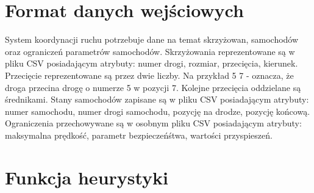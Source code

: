 \section{Format danych wejściowych}

System koordynacji ruchu potrzebuje dane na temat skrzyżowan, samochodów oraz ograniczeń parametrów samochodów.
\newline
\newline
Skrzyżowania reprezentowane są w pliku CSV posiadającym atrybuty: numer drogi, rozmiar, przecięcia, kierunek. Przecięcie reprezentowane są przez dwie liczby. Na przykład 5 7 - oznacza, że droga przecina drogę o numerze 5 w pozycji 7. Kolejne przecięcia oddzielane są średnikami.
\newline
\newline
Stany samochodów zapisane są w pliku CSV posiadającym atrybuty: numer samochodu, numer drogi samochodu, pozycję na drodze, pozycję końcową.
\newline
\newline
Ograniczenia przechowywane są w osobnym pliku CSV posiadającym atrybuty: maksymalna prędkość, parametr bezpieczeńśtwa, wartości przyspieszeń.

\section{Funkcja heurystyki}

